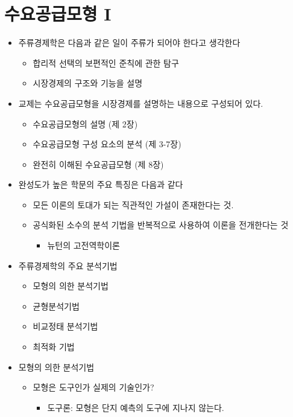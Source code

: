 \documentclass{report}
\begin{document}
\chapter{수요공급모형 I}
\begin{itemize}
    \item 주류경제학은 다음과 같은 일이 주류가 되어야 한다고 생각한다
    \begin{itemize}
        \item 합리적 선택의 보편적인 준칙에 관한 탐구
        \item 시장경제의 구조와 기능을 설명
    \end{itemize}
    \item 교제는 수요공급모형을 시장경제를 설명하는 내용으로 구성되어 있다.
    \begin{itemize}
        \item 수요공급모형의 설명 (제 2장)
        \item 수요공급모형 구성 요소의 분석 (제 3-7장)
        \item 완전히 이해된 수요공급모형 (제 8장)
    \end{itemize}
    \item 완성도가 높은 학문의 주요 특징은 다음과 같다
    \begin{itemize}
        \item 모든 이론의 토대가 되는 직관적인 가설이 존재한다는 것.
        \item 공식화된 소수의 분석 기법을 반복적으로 사용하여 이론을 전개한다는 것
        \begin{itemize}
            \item 뉴턴의 고전역학이론
        \end{itemize}
    \end{itemize}
    \item 주류경제학의 주요 분석기법
    \begin{itemize}
        \item 모형의 의한 분석기법
        \item 균형분석기법
        \item 비교정태 분석기법
        \item 최적화 기법
    \end{itemize}
    \item 모형의 의한 분석기법
    \begin{itemize}
        \item 모형은 도구인가 실제의 기술인가?
        \begin{itemize}
            \item 도구론: 모형은 단지 예측의 도구에 지나지 않는다.

\end{itemize}
\end{itemize}
\end{itemize}
\end{document}
